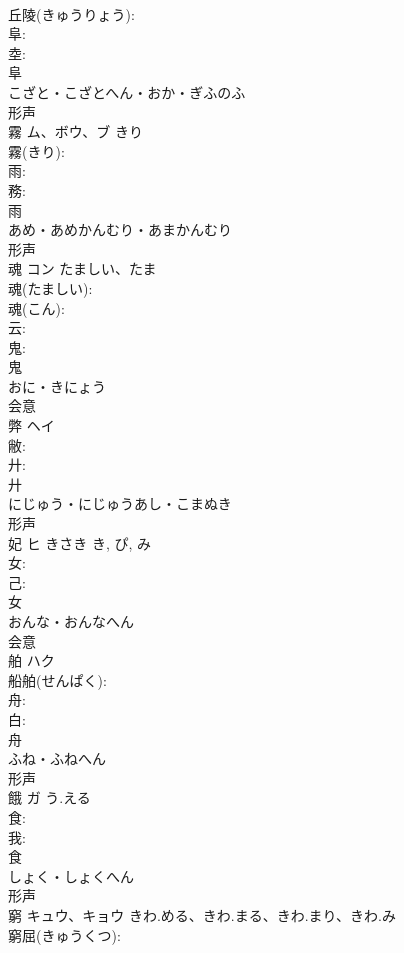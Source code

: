 \documentclass[8pt]{extreport}
\begin{document}
\begin{CJK}{UTF8}{min}
\\	丘陵(きゅうりょう): 
\\	阜: 
\\	坴: 
\\	阜	
\\	こざと・こざとへん・おか・ぎふのふ	
\\	形声 
\\	霧	ム、ボウ、ブ	きり		
\\	霧(きり): 
\\	雨: 
\\	務: 
\\	雨	
\\	あめ・あめかんむり・あまかんむり	
\\	形声 
\\	魂	コン	たましい、たま		
\\	魂(たましい): 
\\	魂(こん): 
\\	云: 
\\	鬼: 
\\	鬼	
\\	おに・きにょう	
\\	会意 
\\	弊	ヘイ			
\\	敝: 
\\	廾: 
\\	廾	
\\	にじゅう・にじゅうあし・こまぬき	
\\	形声 
\\	妃	ヒ	きさき	き, ぴ, み	
\\	女: 
\\	己: 
\\	女	
\\	おんな・おんなへん	
\\	会意 
\\	舶	ハク			
\\	船舶(せんぱく): 
\\	舟: 
\\	白: 
\\	舟	
\\	ふね・ふねへん	
\\	形声 
\\	餓	ガ	う.える		
\\	食: 
\\	我: 
\\	食	
\\	しょく・しょくへん	
\\	形声 
\\	窮	キュウ、キョウ	きわ.める、きわ.まる、きわ.まり、きわ.み		
\\	窮屈(きゅうくつ): 

\end{CJK}
\end{document}
